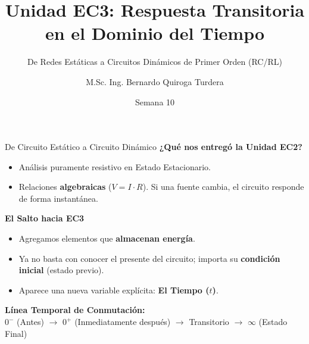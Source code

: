 \documentclass[aspectratio=169, 10pt]{beamer}
\title[Transitorios RC y RL]{Unidad EC3: Respuesta Transitoria en el Dominio del Tiempo}
\subtitle{De Redes Estáticas a Circuitos Dinámicos de Primer Orden (RC/RL)}
\author[B. Quiroga Turdera]{M.Sc. Ing. Bernardo Quiroga Turdera}
\institute[UCB Tarija]{Universidad Católica Boliviana ``San Pablo'' — Sede Tarija}
\date{Semana 10}
\begin{document}
\begin{frame}
    \titlepage
\end{frame}

\begin{frame}{De Circuito Estático a Circuito Dinámico}
    \textbf{¿Qué nos entregó la Unidad EC2?}
    \begin{itemize}
        \item Análisis puramente resistivo en Estado Estacionario.
        \item Relaciones \textbf{algebraicas} ($V = I \cdot R$). Si una fuente cambia, el circuito responde de forma instantánea.
    \end{itemize}
    \vspace{0.3cm}
    \textbf{El Salto hacia EC3}
    \begin{itemize}
        \item Agregamos elementos que \textbf{almacenan energía}.
        \item Ya no basta con conocer el presente del circuito; importa su \textbf{condición inicial} (estado previo).
        \item Aparece una nueva variable explícita: \textbf{El Tiempo ($t$)}.
    \end{itemize}
    \vspace{0.3cm}
    \begin{center}
        \textbf{Línea Temporal de Conmutación:}\\
        $0^-$ (Antes) \quad $\rightarrow$ \quad $0^+$ (Inmediatamente después) \quad $\rightarrow$ \quad Transitorio \quad $\rightarrow$ \quad $\infty$ (Estado Final)
    \end{center}
\end{frame}
\end{document}
